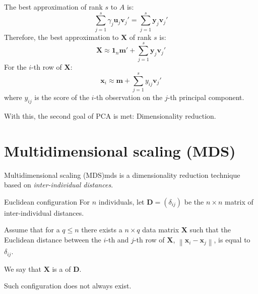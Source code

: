 The best approximation of rank $s$ to $A$ is:
\begin{equation*}
	\sum_{j=1}^s \gamma_j \boldsymbol{u}_j \boldsymbol{v}_j' = \sum_{j=1}^s \boldsymbol{y}_j \boldsymbol{v}_j'
\end{equation*}
Therefore, the best approximation to $\boldsymbol{X}$ of rank $s$ is:
\begin{equation*}
	\boldsymbol{X} \approx \boldsymbol 1_n \boldsymbol m ' + \sum_{j=1}^s \boldsymbol{y}_j \boldsymbol{v}_j'
\end{equation*}
For the $i$-th row of $\boldsymbol{X}$:
\begin{equation*}
	\boldsymbol{x}_i \approx \boldsymbol{m} + \sum_{j=1}^s y_{ij} \boldsymbol{v}_j'
\end{equation*}
where $y_{ij}$ is the score of the $i$-th observation on the $j$-th principal component.

\begin{note}
	With this, the second goal of PCA is met: Dimensionality reduction.
\end{note}

\section{Multidimensional scaling (MDS)}

\begin{definition}{Multidimensional scaling (MDS)}{mds}
	is a dimensionality reduction technique based on \emph{inter-individual distances}.
\end{definition}

\begin{definition}{Euclidean configuration}{}
	For $n$ individuals, let $\boldsymbol{D} = (\delta_{ij})$ be the $n \times n$ matrix of inter-individual
	distances.

	Assume that for a $q \leq n$ there exists a $n \times q$ data matrix $\boldsymbol{X}$ such that
	the Euclidean distance between the $i$-th and $j$-th row of $\boldsymbol{X}$,
	$\left\lVert \boldsymbol{x}_i - \boldsymbol{x}_j \right\rVert$, is equal to $\delta_{ij}$.

	We say that $\boldsymbol{X}$ is a  of $\boldsymbol{D}$.
	\tcblower
	\begin{note}
		Such configuration does not always exist.
	\end{note}
\end{definition}

